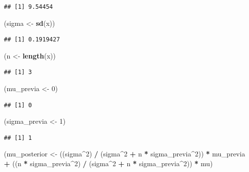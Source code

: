 \documentclass[
  12pt,
]{book}
\newenvironment{Shaded}{\begin{snugshade}}{\end{snugshade}}
\newcommand{\DecValTok}[1]{\textcolor[rgb]{0.00,0.00,0.81}{#1}}
\newcommand{\KeywordTok}[1]{\textcolor[rgb]{0.13,0.29,0.53}{\textbf{#1}}}
\newcommand{\NormalTok}[1]{#1}
\newcommand{\OperatorTok}[1]{\textcolor[rgb]{0.81,0.36,0.00}{\textbf{#1}}}
\newcommand{\StringTok}[1]{\textcolor[rgb]{0.31,0.60,0.02}{#1}}
\begin{document}
\begin{verbatim}
## [1] 9.54454
\end{verbatim}

\begin{Shaded}
\begin{Highlighting}[]
\NormalTok{(sigma \textless{}{-}}\StringTok{ }\KeywordTok{sd}\NormalTok{(x))}
\end{Highlighting}
\end{Shaded}

\begin{verbatim}
## [1] 0.1919427
\end{verbatim}

\begin{Shaded}
\begin{Highlighting}[]
\NormalTok{(n \textless{}{-}}\StringTok{ }\KeywordTok{length}\NormalTok{(x))}
\end{Highlighting}
\end{Shaded}

\begin{verbatim}
## [1] 3
\end{verbatim}

\begin{Shaded}
\begin{Highlighting}[]
\NormalTok{(mu\_previa \textless{}{-}}\StringTok{ }\DecValTok{0}\NormalTok{)}
\end{Highlighting}
\end{Shaded}

\begin{verbatim}
## [1] 0
\end{verbatim}

\begin{Shaded}
\begin{Highlighting}[]
\NormalTok{(sigma\_previa \textless{}{-}}\StringTok{ }\DecValTok{1}\NormalTok{)}
\end{Highlighting}
\end{Shaded}

\begin{verbatim}
## [1] 1
\end{verbatim}

\begin{Shaded}
\begin{Highlighting}[]
\NormalTok{(mu\_posterior \textless{}{-}}\StringTok{ }\NormalTok{((sigma}\OperatorTok{\^{}}\DecValTok{2}\NormalTok{) }\OperatorTok{/}\StringTok{ }\NormalTok{(sigma}\OperatorTok{\^{}}\DecValTok{2} \OperatorTok{+}\StringTok{ }\NormalTok{n }\OperatorTok{*}\StringTok{ }\NormalTok{sigma\_previa}\OperatorTok{\^{}}\DecValTok{2}\NormalTok{)) }\OperatorTok{*}\StringTok{ }\NormalTok{mu\_previa }\OperatorTok{+}\StringTok{ }\NormalTok{((n }\OperatorTok{*}\StringTok{ }\NormalTok{sigma\_previa}\OperatorTok{\^{}}\DecValTok{2}\NormalTok{) }\OperatorTok{/}\StringTok{ }\NormalTok{(sigma}\OperatorTok{\^{}}\DecValTok{2} \OperatorTok{+}\StringTok{ }\NormalTok{n }\OperatorTok{*}\StringTok{ }\NormalTok{sigma\_previa}\OperatorTok{\^{}}\DecValTok{2}\NormalTok{)) }\OperatorTok{*}\StringTok{ }\NormalTok{mu)}
\end{Highlighting}
\end{Shaded}
\end{document}

